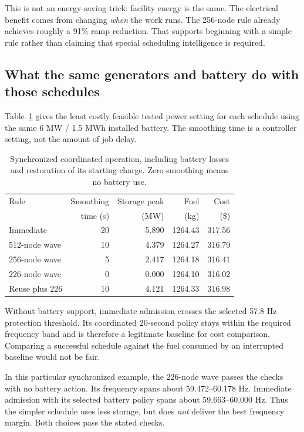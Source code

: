 \documentclass[11pt]{article}
\begin{document}
This is not an energy-saving trick: facility energy is the same.
The electrical benefit comes from changing \emph{when} the work runs.
The 256-node rule already achieves roughly a 91\% ramp reduction.
That supports beginning with a simple rule rather than claiming that
special scheduling intelligence is required.

\subsection{What the same generators and battery do with those schedules}

Table~\ref{tab:operation} gives the least costly feasible tested power
setting for each schedule using the same 6 MW / 1.5 MWh installed battery.
The smoothing time is a controller setting, not the amount of job delay.

\begin{table}[H]
\centering
\small
\begin{tabular}{lrrrr}
\toprule
Rule & Smoothing & Storage peak & Fuel & Cost\\
 & time (s) & (MW) & (kg) & (\$)\\
\midrule
Immediate & 20 & 5.890 & 1264.43 & 317.56\\
512-node wave & 10 & 4.379 & 1264.27 & 316.79\\
256-node wave & 5 & 2.417 & 1264.18 & 316.41\\
226-node wave & 0 & 0.000 & 1264.10 & 316.02\\
Reuse plus 226 & 10 & 4.121 & 1264.33 & 316.98\\
\bottomrule
\end{tabular}
\caption{Synchronized coordinated operation, including battery losses
and restoration of its starting charge. Zero smoothing means no battery use.}
\label{tab:operation}
\end{table}

Without battery support, immediate admission crosses the selected
57.8 Hz protection threshold. Its coordinated 20-second policy stays
within the required frequency band and is therefore a legitimate
baseline for cost comparison. Comparing a successful schedule against
the fuel consumed by an interrupted baseline would not be fair.

In this particular synchronized example, the 226-node wave passes the
checks with no battery action. Its frequency spans about
59.472--60.178 Hz. Immediate admission with its selected battery policy
spans about 59.663--60.000 Hz. Thus the simpler schedule uses less
storage, but does \emph{not} deliver the best frequency margin.
Both choices pass the stated checks.
\end{document}
